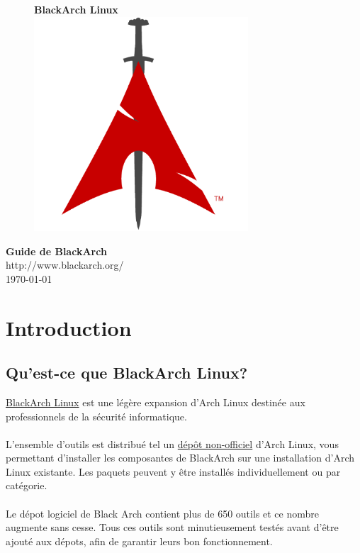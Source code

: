 \documentclass[a4paper, oneside, 11pt]{book}
\begin{document}
\pagestyle{empty}
\begin{center}
\begin{figure}[htbp]
\centering
\vspace{1cm}
\Huge{\textbf{BlackArch \color{red}Linux}}\\
\vspace{2cm}
\includegraphics[width=8cm]{logo.png}
\label{fig:logo}
\end{figure}
\vspace{1cm}
\Huge{\textbf{Guide de BlackArch}}\\
\vspace{1cm}
\Large{\color{red}http://www.blackarch.org/}\\
\vspace{0.5cm}
\Large{\today}
\end{center}
\newpage
\tableofcontents
\newpage
\pagestyle{fancy}


\chapter{Introduction}

\section{Qu'est-ce que BlackArch Linux?}
\href{http://www.blackarch.org}{BlackArch Linux} est une légère expansion d'Arch 
Linux destinée aux professionnels de la sécurité informatique.
\\\\
L'ensemble d'outils est distribué tel un  
\href{https://wiki.archlinux.org/index.php/Unofficial\_User\_Repositories}
{dépôt non-officiel} d'Arch Linux, vous permettant d'installer les composantes de
BlackArch sur une installation d'Arch Linux existante. Les paquets peuvent y être
installés individuellement ou par catégorie.
\\\\
Le dépot logiciel de Black Arch contient plus de 650 outils et ce nombre augmente
sans cesse. Tous ces outils sont minutieusement testés avant d'être ajouté aux
dépots, afin de garantir leurs bon fonctionnement.
\end{document}

